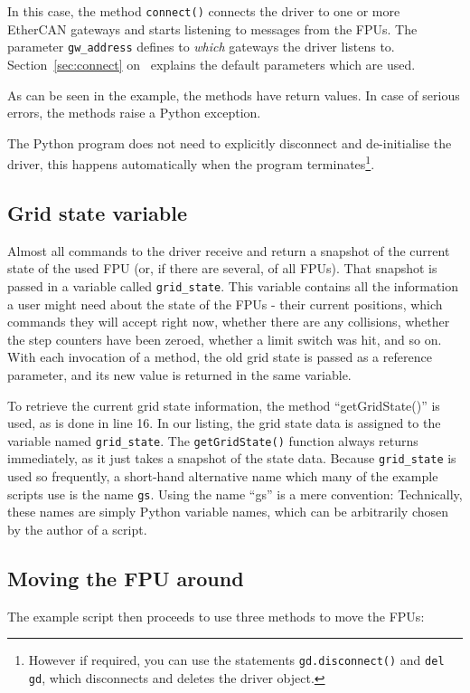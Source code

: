 \documentclass[11pt,a4paper]{scrartcl}
\begin{document}
In this case, the method \texttt{connect()} connects the driver to one
or more EtherCAN gateways and starts listening to messages from the
FPUs. The parameter \texttt{gw\_address} defines to \emph{which}
gateways the driver listens to. Section~\ref{sec:connect}
on~\pageref{sec:connect} explains the default parameters which are
used.

As can be seen in the example, the methods have return values.  In
case of serious errors, the methods raise a Python exception.

The Python program does not need to explicitly disconnect and
de-initialise the driver, this happens automatically when the program
terminates\footnote{However if required, you can use the statements
  \texttt{gd.disconnect()} and \texttt{del gd}, which disconnects and
  deletes the driver object.}.



\subsection{Grid state variable}
 Almost all commands to the driver
receive and return a snapshot of the current state of the used FPU
(or, if there are several, of all FPUs). That snapshot is passed in a
variable called \texttt{grid\_state}. This variable contains all the
information a user might need about the state of the FPUs - their
current positions, which commands they will accept right now, whether
there are any collisions, whether the step counters have been zeroed,
whether a limit switch was hit, and so on. With each invocation of a
method, the old grid state is passed as a reference parameter, and its
new value is returned in the same variable.

To retrieve the current grid state information, the method
``getGridState()'' is used, as is done in line 16. In our listing, the
grid state data is assigned to the variable named
\texttt{grid\_state}.  The \texttt{getGridState()} function always
returns immediately, as it just takes a snapshot of the state
data. Because \texttt{grid\_state} is used so frequently, a short-hand
alternative name which many of the example scripts use is the name
\texttt{gs}.  Using the name ``gs'' is a mere convention: Technically,
these names are simply Python variable names, which can be arbitrarily
chosen by the author of a script.

\subsection{Moving the FPU around}
The example script then proceeds to use three methods to move
the FPUs:
\end{document}
